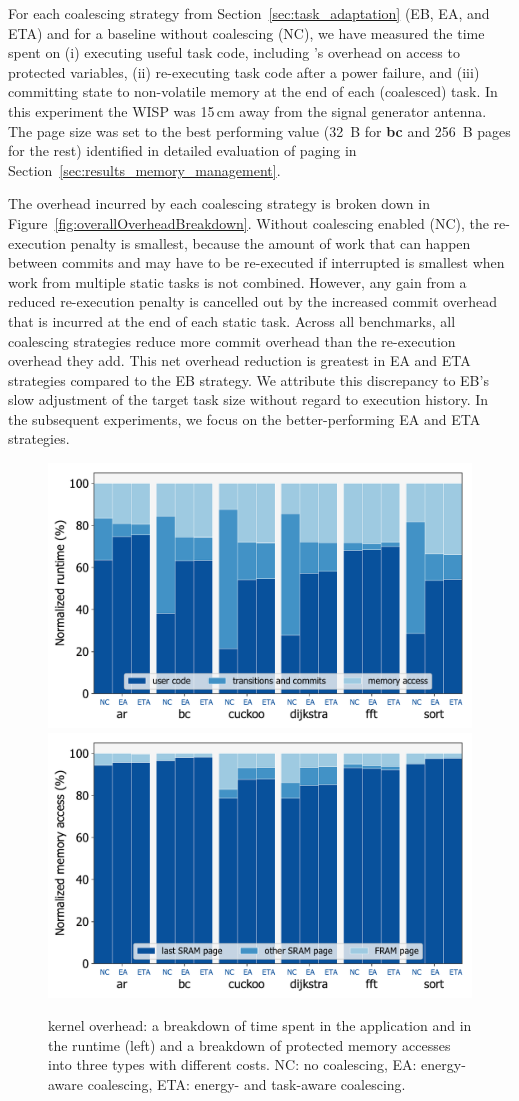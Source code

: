 For each coalescing strategy from Section~\ref{sec:task_adaptation} (EB, EA,
and ETA) and for a baseline without coalescing (NC), we have measured the time
spent on (i) executing useful task code, including \sys's overhead on access to
protected variables, (ii) re-executing task code after a power failure, and
(iii) committing state to non-volatile memory at the end of each (coalesced)
task.  In this experiment the WISP was 15\,cm away from the signal generator
antenna.
%
The page size was set to the best performing value (32~B for \textbf{bc} and
256~B pages for the rest) identified in detailed evaluation of paging in
Section~\ref{sec:results_memory_management}.

The overhead incurred by each coalescing strategy is broken down in
Figure~\ref{fig:overallOverheadBreakdown}. Without coalescing enabled (NC), the
re-execution penalty is smallest, because the amount of work that can happen
between commits and may have to be re-executed if interrupted is smallest when
work from multiple static tasks is not combined.
%
However, any gain from a reduced re-execution penalty is cancelled out by
the increased commit overhead that is incurred at the end of each static
task.
%
Across all benchmarks, all coalescing strategies reduce more commit overhead
than the re-execution overhead they add.
%
This net overhead reduction is greatest in EA and ETA strategies compared
to the EB strategy. We attribute this discrepancy to EB's slow adjustment
of the target task size without regard to execution history.
%
In the subsequent experiments, we focus on the better-performing EA and ETA
strategies.


\begin{figure}
	\centering
	\includegraphics[width=0.49\columnwidth]{figures/overallOverhead}
	\includegraphics[width=0.49\columnwidth]{figures/memAccess}
	\caption{\sys kernel overhead: a breakdown of time spent in
the application and in the runtime (left) and a breakdown of protected memory
accesses into three types with different costs. NC: no coalescing, EA:
energy-aware coalescing, ETA: energy- and task-aware coalescing. }
	\label{fig:coalEfficiency}
\end{figure}

